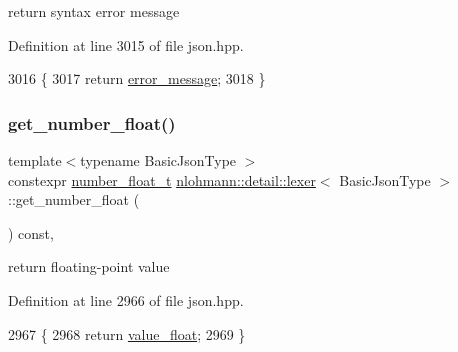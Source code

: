 return syntax error message 



Definition at line 3015 of file json.\+hpp.


\begin{DoxyCode}
3016     \{
3017         \textcolor{keywordflow}{return} \hyperlink{classnlohmann_1_1detail_1_1lexer_ae2a15e440f1889e0ab0c6a35344e48df}{error\_message};
3018     \}
\end{DoxyCode}
\mbox{\label{classnlohmann_1_1detail_1_1lexer_ac013af35a21e9387993b19da5b3e0ae2}} 
\subsubsection{\texorpdfstring{get\+\_\+number\+\_\+float()}{get\_number\_float()}}
{\footnotesize\ttfamily template$<$typename Basic\+Json\+Type $>$ \\
constexpr \hyperlink{classnlohmann_1_1detail_1_1lexer_aa7f9e7b2bcd311fb86e2da43761a6619}{number\+\_\+float\+\_\+t} \hyperlink{classnlohmann_1_1detail_1_1lexer}{nlohmann\+::detail\+::lexer}$<$ Basic\+Json\+Type $>$\+::get\+\_\+number\+\_\+float (\begin{DoxyParamCaption}{ }\end{DoxyParamCaption}) const\hspace{0.3cm}{\ttfamily [inline]}, {\ttfamily [noexcept]}}



return floating-\/point value 



Definition at line 2966 of file json.\+hpp.


\begin{DoxyCode}
2967     \{
2968         \textcolor{keywordflow}{return} \hyperlink{classnlohmann_1_1detail_1_1lexer_a861ce804da2d257ee373d1e0b55780e1}{value\_float};
2969     \}
\end{DoxyCode}
\mbox{\label{classnlohmann_1_1detail_1_1lexer_afa338d17c0a7e834c73104258a2c8ced}} 

